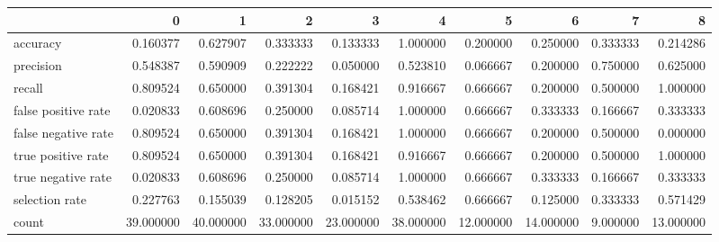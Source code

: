 \begin{tabular}{lrrrrrrrrr}
\toprule
{} &          0 &          1 &          2 &          3 &          4 &          5 &          6 &         7 &          8 \\
\midrule
accuracy            &   0.160377 &   0.627907 &   0.333333 &   0.133333 &   1.000000 &   0.200000 &   0.250000 &  0.333333 &   0.214286 \\
precision           &   0.548387 &   0.590909 &   0.222222 &   0.050000 &   0.523810 &   0.066667 &   0.200000 &  0.750000 &   0.625000 \\
recall              &   0.809524 &   0.650000 &   0.391304 &   0.168421 &   0.916667 &   0.666667 &   0.200000 &  0.500000 &   1.000000 \\
false positive rate &   0.020833 &   0.608696 &   0.250000 &   0.085714 &   1.000000 &   0.666667 &   0.333333 &  0.166667 &   0.333333 \\
false negative rate &   0.809524 &   0.650000 &   0.391304 &   0.168421 &   1.000000 &   0.666667 &   0.200000 &  0.500000 &   0.000000 \\
true positive rate  &   0.809524 &   0.650000 &   0.391304 &   0.168421 &   0.916667 &   0.666667 &   0.200000 &  0.500000 &   1.000000 \\
true negative rate  &   0.020833 &   0.608696 &   0.250000 &   0.085714 &   1.000000 &   0.666667 &   0.333333 &  0.166667 &   0.333333 \\
selection rate      &   0.227763 &   0.155039 &   0.128205 &   0.015152 &   0.538462 &   0.666667 &   0.125000 &  0.333333 &   0.571429 \\
count               &  39.000000 &  40.000000 &  33.000000 &  23.000000 &  38.000000 &  12.000000 &  14.000000 &  9.000000 &  13.000000 \\
\bottomrule
\end{tabular}
